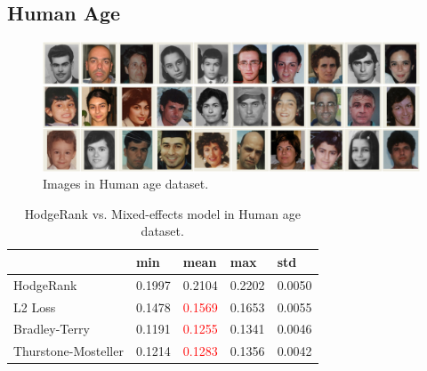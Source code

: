 \documentclass[10pt,journal,cspaper,compsoc]{IEEEtran}
\begin{document}
{\subsection{Human Age}



\begin{figure}[h]
 \begin{center}
\includegraphics[width=0.8\linewidth]{agedataset.png}
  \caption{Images in Human age dataset.} \label{agedataset}
\end{center}
\end{figure}


\begin{table}[h]\caption{\label{tab:age} HodgeRank vs. Mixed-effects model in Human age dataset.}
\centering
\begin{tabular}{lllll}
 \hline     &min  &mean &max &std\\
 \hline  HodgeRank     &0.1997    &0.2104    &0.2202    &0.0050 \\
\hline  L2 Loss     &0.1478    &\textcolor{red}{0.1569}    &0.1653    &0.0055  \\
\hline Bradley-Terry  &0.1191    &\textcolor{red}{0.1255}    &0.1341    &0.0046 \\
\hline Thurstone-Mosteller    &0.1214    &\textcolor{red}{0.1283}    &0.1356    &0.0042  \\
 \hline
 \end {tabular}
\end{table}




}
\end{document}
